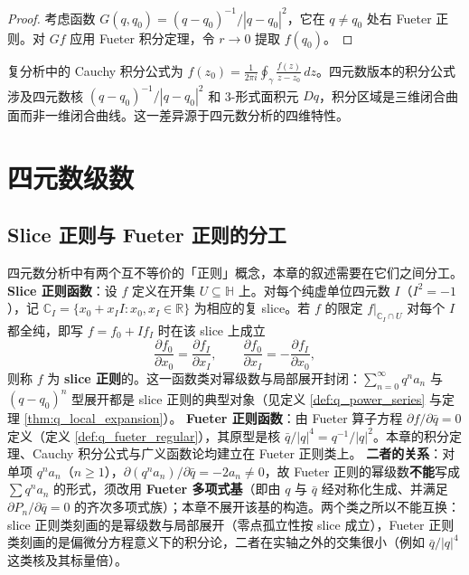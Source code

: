 \begin{proof}
考虑函数 $G(q,q_0)=(q-q_0)^{-1}/|q-q_0|^2$，它在 $q\neq q_0$ 处右 Fueter 正则。对 $G f$ 应用 Fueter 积分定理，令 $r\to 0$ 提取 $f(q_0)$。
\end{proof}

\begin{remark}\label{rem:q_cauchy_vs_complex}
复分析中的 Cauchy 积分公式为 $f(z_0)=\frac{1}{2\pi i}\oint_\gamma \frac{f(z)}{z-z_0}\,dz$。四元数版本的积分公式涉及四元数核 $(q-q_0)^{-1}/|q-q_0|^2$ 和 3-形式面积元 $Dq$，积分区域是三维闭合曲面而非一维闭合曲线。这一差异源于四元数分析的四维特性。
\end{remark}

\section{四元数级数}

\subsection{Slice 正则与 Fueter 正则的分工}\label{sec:q_slice_vs_fueter}

\begin{remark}[两个函数类的分工]\label{rem:q_slice_vs_fueter}
四元数分析中有两个互不等价的「正则」概念，本章的叙述需要在它们之间分工。
\textbf{Slice 正则函数}：设 $f$ 定义在开集 $U\subseteq\mathbb{H}$ 上。对每个纯虚单位四元数 $I$（$I^2=-1$），记 $\mathbb{C}_I=\{x_0+x_II:x_0,x_I\in\mathbb{R}\}$ 为相应的复 slice。若 $f$ 的限定 $f|_{\mathbb{C}_I\cap U}$ 对每个 $I$ 都全纯，即写 $f=f_0+If_I$ 时在该 slice 上成立
\[
\frac{\partial f_0}{\partial x_0}=\frac{\partial f_I}{\partial x_I},\qquad
\frac{\partial f_0}{\partial x_I}=-\frac{\partial f_I}{\partial x_0},
\]
则称 $f$ 为 \textbf{slice 正则}的。这一函数类对幂级数与局部展开封闭：$\sum_{n=0}^\infty q^n a_n$ 与 $(q-q_0)^n$ 型展开都是 slice 正则的典型对象（见定义 \ref{def:q_power_series} 与定理 \ref{thm:q_local_expansion}）。
\textbf{Fueter 正则函数}：由 Fueter 算子方程 $\partial f/\partial\bar q=0$ 定义（定义 \ref{def:q_fueter_regular}），其原型是核 $\bar q/|q|^4=q^{-1}/|q|^2$。本章的积分定理、Cauchy 积分公式与广义函数论均建立在 Fueter 正则类上。
\textbf{二者的关系}：对单项 $q^n a_n$（$n\ge 1$），$\partial(q^n a_n)/\partial\bar q=-2a_n\neq 0$，故 Fueter 正则的幂级数\textbf{不能}写成 $\sum q^n a_n$ 的形式，须改用 \textbf{Fueter 多项式基}（即由 $q$ 与 $\bar q$ 经对称化生成、并满足 $\partial P_n/\partial\bar q=0$ 的齐次多项式族）；本章不展开该基的构造。两个类之所以不能互换：slice 正则类刻画的是幂级数与局部展开（零点孤立性按 slice 成立），Fueter 正则类刻画的是偏微分方程意义下的积分论，二者在实轴之外的交集很小（例如 $\bar q/|q|^4$ 这类核及其标量倍）。
\end{remark}

